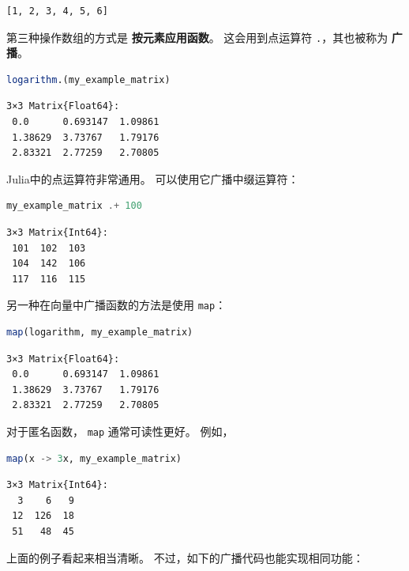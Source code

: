 \documentclass[
  notoc %
]{tufte-book}
\newcommand{\passthrough}[1]{#1}
\begin{document}
\begin{lstlisting}[language=Output]
[1, 2, 3, 4, 5, 6]
\end{lstlisting}

第三种操作数组的方式是 \textbf{按元素应用函数}。 这会用到点运算符
\passthrough{\lstinline!.!}，其也被称为 \textbf{广播}。

\begin{lstlisting}[language=Julia]
logarithm.(my_example_matrix)
\end{lstlisting}

\begin{lstlisting}[language=Output]
3×3 Matrix{Float64}:
 0.0      0.693147  1.09861
 1.38629  3.73767   1.79176
 2.83321  2.77259   2.70805
\end{lstlisting}

Julia中的点运算符非常通用。 可以使用它广播中缀运算符：

\begin{lstlisting}[language=Julia]
my_example_matrix .+ 100
\end{lstlisting}

\begin{lstlisting}[language=Output]
3×3 Matrix{Int64}:
 101  102  103
 104  142  106
 117  116  115
\end{lstlisting}

另一种在向量中广播函数的方法是使用 \passthrough{\lstinline!map!}：

\begin{lstlisting}[language=Julia]
map(logarithm, my_example_matrix)
\end{lstlisting}

\begin{lstlisting}[language=Output]
3×3 Matrix{Float64}:
 0.0      0.693147  1.09861
 1.38629  3.73767   1.79176
 2.83321  2.77259   2.70805
\end{lstlisting}

对于匿名函数， \passthrough{\lstinline!map!} 通常可读性更好。 例如，

\begin{lstlisting}[language=Julia]
map(x -> 3x, my_example_matrix)
\end{lstlisting}

\begin{lstlisting}[language=Output]
3×3 Matrix{Int64}:
  3    6   9
 12  126  18
 51   48  45
\end{lstlisting}

上面的例子看起来相当清晰。 不过，如下的广播代码也能实现相同功能：
\end{document}

